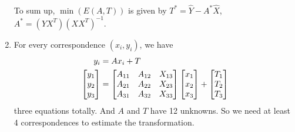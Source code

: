 \documentclass[bwprint]{gmcmthesis}
\numberwithin{figure}{section}
\begin{document}
\begin{enumerate}[label=\alph*.]
\begin{align}
    \end{align}
    To sum up, $\min(E(A, T))$ is given by $T^* = \hat{Y} - A^*\hat{X}$, $A^* = (YX^T)(XX^T)^{-1}$.
    \item For every correspondence $(x_i, y_i)$, we have
    \begin{align}
        y_i &= Ax_i + T \notag \\
        \begin{bmatrix}
            y_1 \\
            y_2 \\
            y_3
        \end{bmatrix} &= \begin{bmatrix}
                A_{11} & A_{12} & X_{13} \\
                A_{21} & A_{22} & X_{23} \\
                A_{31} & A_{32} & X_{33}
            \end{bmatrix}
            \begin{bmatrix}
                x_1 \\
                x_2 \\
                x_3
            \end{bmatrix} +
            \begin{bmatrix}
                T_1 \\
                T_2 \\
                T_3
            \end{bmatrix} \notag
    \end{align}
    three equations totally. And $A$ and $T$ have 12 unknowns. So we need at least 4 correspondences to estimate the transformation.
\end{enumerate}
\end{document}
